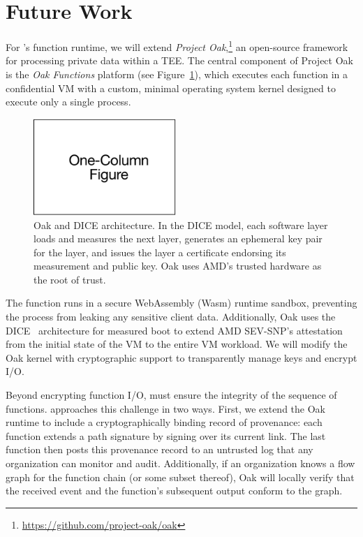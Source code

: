 \section{Future Work}
\label{sec:future}

%
For \SystemName's function runtime, we will extend \emph{Project Oak},\footnote{
\url{https://github.com/project-oak/oak}
}
an open-source framework for processing private data within a TEE\@.
%
The central component of Project Oak is the \emph{Oak Functions} platform (see
Figure~\ref{fig:oak}), which executes each function in a confidential VM with a
custom, minimal operating system kernel designed to execute only a single
process.
%
\begin{figure}
    \centering
    \includegraphics[page = 3, width=0.48\textwidth]{diagrams/slides.pdf}
    \caption{Oak and DICE architecture.
    In the DICE model, each software layer loads and measures the next layer,
    generates an ephemeral key pair for the layer, and issues the layer a
    certificate endorsing its measurement and public key.
    Oak uses AMD's trusted hardware as the root of trust.
    }
    \label{fig:oak}
\end{figure}
%
The function runs in a secure WebAssembly (Wasm) runtime sandbox, preventing
the process from leaking any sensitive client data.
%
Additionally, Oak uses the DICE~\cite{24-misc-dice} architecture for measured
boot to extend AMD SEV-SNP's attestation from the initial state of the VM
to the entire VM workload.
%
We will modify the Oak kernel with cryptographic support to transparently
manage keys and encrypt I/O\@.


%
Beyond encrypting function I/O, \SystemName must ensure the integrity
of the sequence of functions.
%
%
\SystemName approaches this challenge in two ways.
%
First, we extend the Oak runtime to include a cryptographically binding record
of provenance: each function extends a path signature by signing over its
current link.
%
The last function then posts this provenance record to an untrusted log that
any organization can monitor and audit.
%
Additionally, if an organization knows a flow graph for the function chain (or
some subset thereof),  Oak will locally verify that the received event and the
function's subsequent output conform to the graph.


